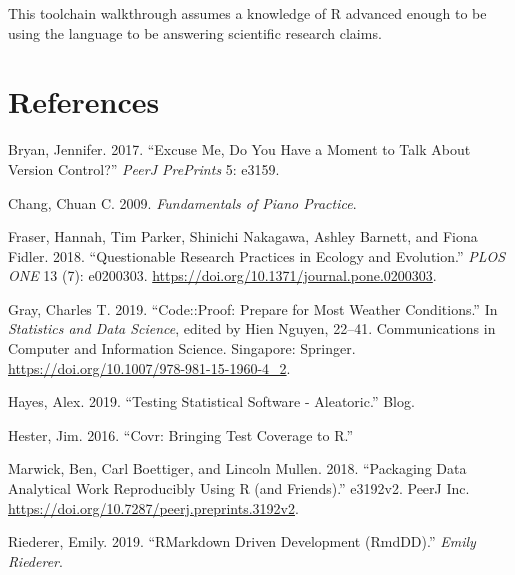 \documentclass[
]{article}
\newlength{\cslhangindent}
\newenvironment{cslreferences}%
  {\setlength{\parindent}{0pt}%
  \everypar{\setlength{\hangindent}{\cslhangindent}}\ignorespaces}%
  {\par}
\begin{document}
This toolchain walkthrough assumes a knowledge of R advanced enough to
be using the language to be answering scientific research claims.

\hypertarget{section}{%
\subsection{}\label{section}}

\hypertarget{references}{%
\section*{References}\label{references}}

\hypertarget{refs}{}
\begin{cslreferences}
\leavevmode\hypertarget{ref-Bryan2017ExcuseMD}{}%
Bryan, Jennifer. 2017. ``Excuse Me, Do You Have a Moment to Talk About
Version Control?'' \emph{PeerJ PrePrints} 5: e3159.

\leavevmode\hypertarget{ref-chang_fundamentalspianopractice_2009a}{}%
Chang, Chuan C. 2009. \emph{Fundamentals of Piano Practice}.

\leavevmode\hypertarget{ref-fraser_questionable_2018}{}%
Fraser, Hannah, Tim Parker, Shinichi Nakagawa, Ashley Barnett, and Fiona
Fidler. 2018. ``Questionable Research Practices in Ecology and
Evolution.'' \emph{PLOS ONE} 13 (7): e0200303.
\url{https://doi.org/10.1371/journal.pone.0200303}.

\leavevmode\hypertarget{ref-grayCodeProofPrepare2019}{}%
Gray, Charles T. 2019. ``Code::Proof: Prepare for Most Weather
Conditions.'' In \emph{Statistics and Data Science}, edited by Hien
Nguyen, 22--41. Communications in Computer and Information Science.
Singapore: Springer. \url{https://doi.org/10.1007/978-981-15-1960-4_2}.

\leavevmode\hypertarget{ref-hayes_testing_2019}{}%
Hayes, Alex. 2019. ``Testing Statistical Software - Aleatoric.'' Blog.

\leavevmode\hypertarget{ref-hester_covr_2016}{}%
Hester, Jim. 2016. ``Covr: Bringing Test Coverage to R.''

\leavevmode\hypertarget{ref-marwick_packaging_2018}{}%
Marwick, Ben, Carl Boettiger, and Lincoln Mullen. 2018. ``Packaging Data
Analytical Work Reproducibly Using R (and Friends).'' e3192v2. PeerJ
Inc. \url{https://doi.org/10.7287/peerj.preprints.3192v2}.

\leavevmode\hypertarget{ref-riederer_rmarkdowndrivendevelopment_2019}{}%
Riederer, Emily. 2019. ``RMarkdown Driven Development (RmdDD).''
\emph{Emily Riederer}.


\end{cslreferences}
\end{document}
